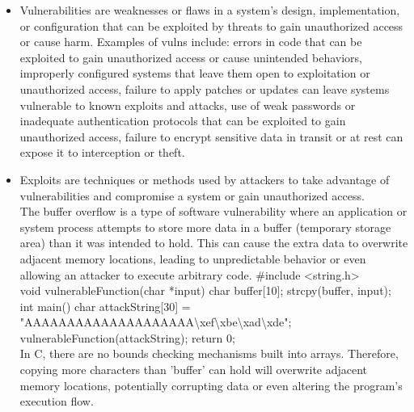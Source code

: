 \documentclass{article}
\begin{document}
\begin{itemize}
	\item[] Vulnerabilities are weaknesses or flaws in a system's design, implementation, or configuration that can be exploited by threats to gain unauthorized access or cause harm. Examples of vulns include: errors in code that can be exploited to gain unauthorized access or cause unintended behaviors,  improperly configured systems that leave them open to exploitation or unauthorized access, failure to apply patches or updates can leave systems vulnerable to known exploits and attacks, use of weak passwords or inadequate authentication protocols that can be exploited to gain unauthorized access, failure to encrypt sensitive data in transit or at rest can expose it to interception or theft.
	\item[] Exploits are techniques or methods used by attackers to take advantage of vulnerabilities and compromise a system or gain unauthorized access.\\
	The buffer overflow is a type of software vulnerability where an application or system process attempts to store more data in a buffer (temporary storage area) than it was intended to hold. This can cause the extra data to overwrite adjacent memory locations, leading to unpredictable behavior or even allowing an attacker to execute arbitrary code.
	\#include \textless string.h\textgreater\\
	void vulnerableFunction(char *input) {char buffer[10]; strcpy(buffer, input);}\\
	int main() {char attackString[30] = "AAAAAAAAAAAAAAAAAAAA\textbackslash{}xef\textbackslash{}xbe\textbackslash{}xad\textbackslash{}xde"; vulnerableFunction(attackString); return 0;}\\
	In C, there are no bounds checking mechanisms built into arrays. Therefore, copying more characters than 'buffer' can hold will overwrite adjacent memory locations, potentially corrupting data or even altering the program's execution flow.\\

\end{itemize}
\end{document}
